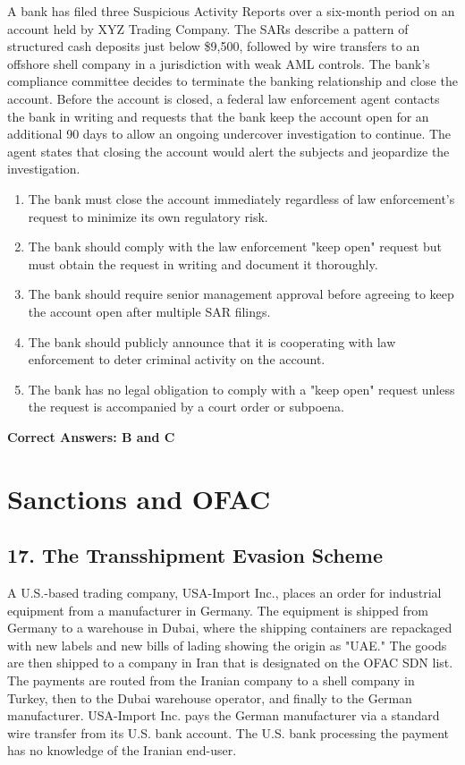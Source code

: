 \documentclass[11pt,a4paper]{article}
\begin{document}
	A bank has filed three Suspicious Activity Reports over a six-month period on an account held by XYZ Trading Company. The SARs describe a pattern of structured cash deposits just below \$9,500, followed by wire transfers to an offshore shell company in a jurisdiction with weak AML controls. The bank's compliance committee decides to terminate the banking relationship and close the account. Before the account is closed, a federal law enforcement agent contacts the bank in writing and requests that the bank keep the account open for an additional 90 days to allow an ongoing undercover investigation to continue. The agent states that closing the account would alert the subjects and jeopardize the investigation.
	
	\begin{enumerate}[label=\Alph*.]
		\item The bank must close the account immediately regardless of law enforcement's request to minimize its own regulatory risk.
		\item The bank should comply with the law enforcement "keep open" request but must obtain the request in writing and document it thoroughly.
		\item The bank should require senior management approval before agreeing to keep the account open after multiple SAR filings.
		\item The bank should publicly announce that it is cooperating with law enforcement to deter criminal activity on the account.
		\item The bank has no legal obligation to comply with a "keep open" request unless the request is accompanied by a court order or subpoena.
	\end{enumerate}
	
	\textbf{Correct Answers: B and C}
	
	\section{Sanctions and OFAC}
	
	\subsection{17. The Transshipment Evasion Scheme}
	
	A U.S.-based trading company, USA-Import Inc., places an order for industrial equipment from a manufacturer in Germany. The equipment is shipped from Germany to a warehouse in Dubai, where the shipping containers are repackaged with new labels and new bills of lading showing the origin as "UAE." The goods are then shipped to a company in Iran that is designated on the OFAC SDN list. The payments are routed from the Iranian company to a shell company in Turkey, then to the Dubai warehouse operator, and finally to the German manufacturer. USA-Import Inc. pays the German manufacturer via a standard wire transfer from its U.S. bank account. The U.S. bank processing the payment has no knowledge of the Iranian end-user.
	
\end{document}
